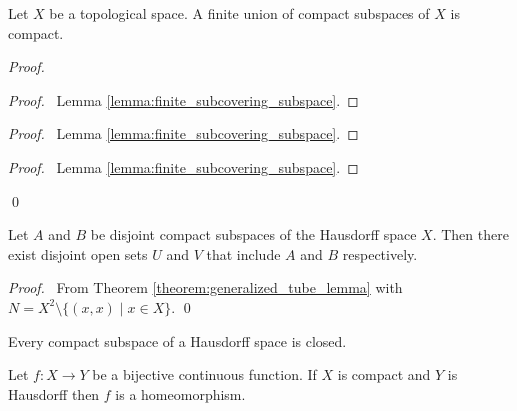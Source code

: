 \begin{proposition}
    \label{proposition:finite_union_compact}
    Let $X$ be a topological space. A finite union of compact subspaces of $X$ is compact.
\end{proposition}

\begin{proof}
    \pf
    \begin{proof}
        \pf\ Lemma \ref{lemma:finite_subcovering_subspace}.
    \end{proof}
    \begin{proof}
        \pf\ Lemma \ref{lemma:finite_subcovering_subspace}.
    \end{proof}
    \qedstep
    \begin{proof}
        \pf\ Lemma \ref{lemma:finite_subcovering_subspace}.
    \end{proof}
    \qed
\end{proof}

\begin{proposition}
    \label{proposition:disjoint_neighbourhoods_compact_Hausdorff}
    Let $A$ and $B$ be disjoint compact subspaces of the Hausdorff space $X$.
    Then there exist disjoint open sets $U$ and $V$ that include $A$ and $B$
    respectively.
\end{proposition}

\begin{proof}
    \pf\ From Theorem \ref{theorem:generalized_tube_lemma} with $N = X^2 \setminus \{ (x,x) \mid x \in X \}$. \qed
\end{proof}

\begin{corollary}
    \label{corollary:closed_compact}
    Every compact subspace of a Hausdorff space is closed.
\end{corollary}

\begin{theorem}
    Let $f : X \rightarrow Y$ be a bijective continuous function. If $X$ is
    compact and $Y$ is Hausdorff then $f$ is a homeomorphism.
\end{theorem}

